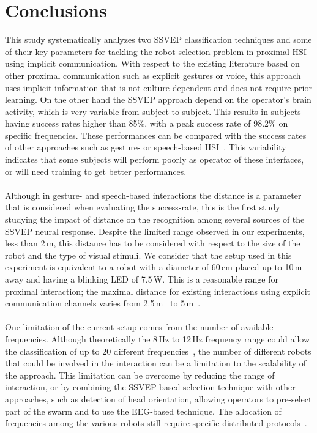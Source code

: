 \documentclass[smallextended]{svjour3}
\begin{document}
\section{Conclusions}
This study systematically analyzes two SSVEP classification techniques and some of their key parameters for tackling the robot selection problem in proximal HSI using implicit communication. 
With respect to the existing literature based on other proximal communication such as explicit gestures or voice, this approach uses implicit information that is not culture-dependent and does not require prior learning. On the other hand the SSVEP approach depend on the operator's brain activity, which is very variable from subject to subject. This results in subjects having success rates higher than 85\%, with a peak success rate of 98.2\% on specific frequencies. These performances can be compared with the success rates of other approaches such as gesture- or speech-based HSI~\cite{Nagietal2014,Pourmehr2013}. This variability indicates that some subjects will perform poorly as operator of these interfaces, or will need training to get better performances.\\
\\
Although in gesture- and speech-based interactions the distance is a parameter that is considered when evaluating the success-rate, this is the first study studying the impact of distance on the recognition among several sources of the SSVEP neural response.
Despite the limited range observed in our experiments, less than 2\,m, this distance has to be considered with respect to the size of the robot and the type of visual stimuli. We consider that the setup used in this experiment is equivalent to a robot with a diameter of 60\,cm placed up to 10\,m away and having a blinking LED of 7.5\,W. This is a reasonable range for proximal interaction; the maximal distance for existing interactions using explicit communication channels varies from 2.5\,m~\cite{Pourmehr2013} to 5\,m~\cite{Nagietal2014}.\\
\\
One limitation of the current setup comes from the number of available frequencies.
Although theoretically the 8\,Hz to 12\,Hz frequency range could allow the classification of up to 20 different frequencies~\cite{SSVEPfiability}, the number of different robots that could be involved in the interaction can be a limitation to the scalability of the approach. This limitation can be overcome by reducing the range of interaction, or by combining the SSVEP-based selection technique with other approaches, such as detection of head orientation, allowing operators to pre-select part of the swarm and to use the EEG-based technique. The allocation of frequencies among the various robots still require specific distributed protocols~\cite{mathews2015spatially}.\\
\end{document}
